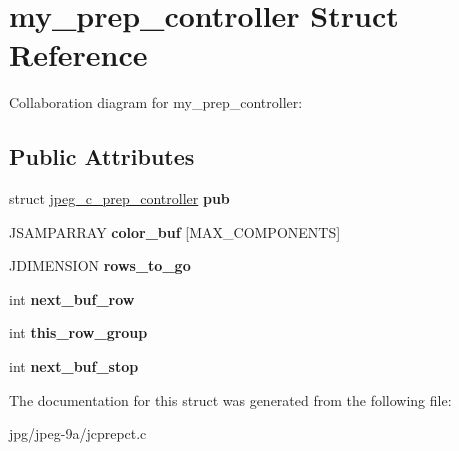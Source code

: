 \hypertarget{structmy__prep__controller}{\section{my\+\_\+prep\+\_\+controller Struct Reference}
\label{structmy__prep__controller}
}


Collaboration diagram for my\+\_\+prep\+\_\+controller\+:
\subsection*{Public Attributes}
\begin{DoxyCompactItemize}
\item 
\hypertarget{structmy__prep__controller_a3fb45ffb334d46e9786e32eefded333a}{struct \hyperlink{structjpeg__c__prep__controller}{jpeg\+\_\+c\+\_\+prep\+\_\+controller} {\bfseries pub}}\label{structmy__prep__controller_a3fb45ffb334d46e9786e32eefded333a}

\item 
\hypertarget{structmy__prep__controller_ac1479671472328faf5d381a202658783}{J\+S\+A\+M\+P\+A\+R\+R\+A\+Y {\bfseries color\+\_\+buf} \mbox{[}M\+A\+X\+\_\+\+C\+O\+M\+P\+O\+N\+E\+N\+T\+S\mbox{]}}\label{structmy__prep__controller_ac1479671472328faf5d381a202658783}

\item 
\hypertarget{structmy__prep__controller_a824b65d503dae6698d6a482d49a8043c}{J\+D\+I\+M\+E\+N\+S\+I\+O\+N {\bfseries rows\+\_\+to\+\_\+go}}\label{structmy__prep__controller_a824b65d503dae6698d6a482d49a8043c}

\item 
\hypertarget{structmy__prep__controller_af93cf69d2ea14660586c93a1b08774a2}{int {\bfseries next\+\_\+buf\+\_\+row}}\label{structmy__prep__controller_af93cf69d2ea14660586c93a1b08774a2}

\item 
\hypertarget{structmy__prep__controller_a2fd911bc5ad6043822b493554513b8bb}{int {\bfseries this\+\_\+row\+\_\+group}}\label{structmy__prep__controller_a2fd911bc5ad6043822b493554513b8bb}

\item 
\hypertarget{structmy__prep__controller_a1332bc531a2d55aaef228a3a9a3fd62f}{int {\bfseries next\+\_\+buf\+\_\+stop}}\label{structmy__prep__controller_a1332bc531a2d55aaef228a3a9a3fd62f}

\end{DoxyCompactItemize}


The documentation for this struct was generated from the following file\+:\begin{DoxyCompactItemize}
\item 
jpg/jpeg-\/9a/jcprepct.\+c\end{DoxyCompactItemize}
